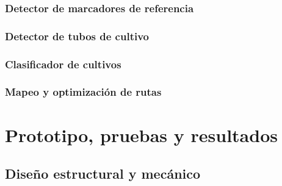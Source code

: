 \documentclass[a4paper,12pt]{report}
\begin{document}
\subsection{Detector de marcadores de referencia}





\subsection{Detector de tubos de cultivo}




\subsection{Clasificador de cultivos}



\subsection{Mapeo y optimización de rutas}



%
%
%
%

\chapter{Prototipo, pruebas y resultados}
\section{Diseño estructural y mecánico}





%
%
\end{document}
